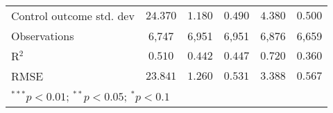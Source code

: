 \begin{table}
\begin{center}
\begin{tabular}{l c c c c c}
Control outcome std. dev                                                                     & $24.370$        & $1.180$                      & $0.490$        & $4.380$                       & $0.500$        \\
Observations                                                                                 & 6,747           & 6,951                        & 6,951          & 6,876                         & 6,659          \\
R$^{2}$                                                                                      & $0.510$         & $0.442$                      & $0.447$        & $0.720$                       & $0.360$        \\
RMSE                                                                                         & $23.841$        & $1.260$                      & $0.531$        & $3.388$                       & $0.567$        \\
\hline
\multicolumn{6}{l}{\scriptsize{$^{***}p<0.01$; $^{**}p<0.05$; $^{*}p<0.1$}}
\end{tabular}
\caption{}
\label{table:SI_table17_cw_het_B}
\end{center}
\end{table}
